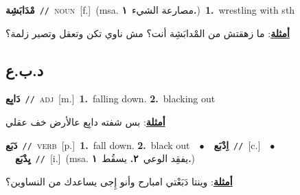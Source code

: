 \documentclass[10pt,a4paper,twoside]{article} %
\begin{document}
\begin{multicols}{2}
{\setlength\topsep{0pt}\textbf{\foreignlanguage{arabic}{مْدَابَشِة}}\ {\color{gray}\texttt{//}\color{black}}\ \textsc{noun}\ [f.]\ \color{gray}(msa. \foreignlanguage{arabic}{مصارعة الشيء}~\foreignlanguage{arabic}{\textbf{١.}})\color{black}\ \textbf{1.}~wrestling with sth\  \begin{flushright}\color{gray}\foreignlanguage{arabic}{\textbf{\underline{\foreignlanguage{arabic}{أمثلة}}}: ما زهقتش من المْدابَشِة أنت؟ مش ناوي تكن وتعقل وتصير زلمة؟}\end{flushright}\color{black}} \vspace{2mm}

\vspace{-3mm}
\subsection*{\color{blue}\foreignlanguage{arabic}{د.ب.ع}\color{blue}{}} 

{\setlength\topsep{0pt}\textbf{\foreignlanguage{arabic}{دَابِع}}\ {\color{gray}\texttt{//}\color{black}}\ \textsc{adj}\ [m.]\ \textbf{1.}~falling down.  \textbf{2.}~blacking out\  \begin{flushright}\color{gray}\foreignlanguage{arabic}{\textbf{\underline{\foreignlanguage{arabic}{أمثلة}}}: بس شفته دابِع عالأرض خف عقلي}\end{flushright}\color{black}} \vspace{2mm}

{\setlength\topsep{0pt}\textbf{\foreignlanguage{arabic}{دَبَع}}\ {\color{gray}\texttt{//}\color{black}}\ \textsc{verb}\ [p.]\ \textbf{1.}~fall down.  \textbf{2.}~black out\ \ $\bullet$\ \ \setlength\topsep{0pt}\textbf{\foreignlanguage{arabic}{اِدْبَع}}\ {\color{gray}\texttt{//}\color{black}}\ [c.]\ \ $\bullet$\ \ \setlength\topsep{0pt}\textbf{\foreignlanguage{arabic}{يِدْبَع}}\ {\color{gray}\texttt{//}\color{black}}\ [i.]\ \color{gray}(msa. \foreignlanguage{arabic}{يفقِد الوعي}~\foreignlanguage{arabic}{\textbf{٢.}}  \foreignlanguage{arabic}{يسقُط}~\foreignlanguage{arabic}{\textbf{١.}})\color{black}\  \begin{flushright}\color{gray}\foreignlanguage{arabic}{\textbf{\underline{\foreignlanguage{arabic}{أمثلة}}}: وينتا دَبَعْتي امبارح وأنو إِجى يساعدك من النساوين؟}\end{flushright}\color{black}} \vspace{2mm}


\end{multicols}
\end{document}
